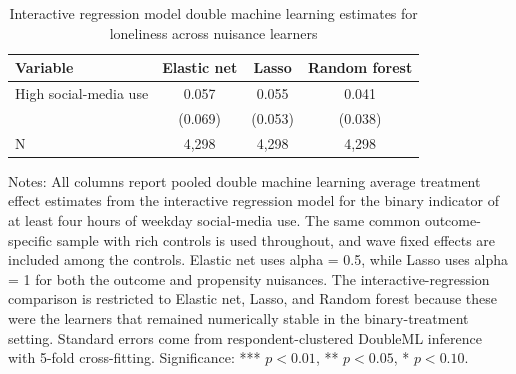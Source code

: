 \begin{table}[!htbp]
\centering
\caption{Interactive regression model double machine learning estimates for loneliness across nuisance learners}
\label{tab:irm_loneliness_methods}
\begin{tabular}{lccc}
\hline
Variable & Elastic net & Lasso & Random forest
\\
\hline
High social-media use & 0.057 & 0.055 & 0.041
\\
 & (0.069) & (0.053) & (0.038)
\\
N & 4,298 & 4,298 & 4,298
\\
\hline
\end{tabular}
\begin{minipage}{0.95\textwidth}
\footnotesize Notes: All columns report pooled double machine learning average treatment effect estimates from the interactive regression model for the binary indicator of at least four hours of weekday social-media use. The same common outcome-specific sample with rich controls is used throughout, and wave fixed effects are included among the controls. Elastic net uses alpha = 0.5, while Lasso uses alpha = 1 for both the outcome and propensity nuisances. The interactive-regression comparison is restricted to Elastic net, Lasso, and Random forest because these were the learners that remained numerically stable in the binary-treatment setting. Standard errors come from respondent-clustered DoubleML inference with 5-fold cross-fitting. Significance: *** \(p < 0.01\), ** \(p < 0.05\), * \(p < 0.10\).
\end{minipage}
\end{table}

